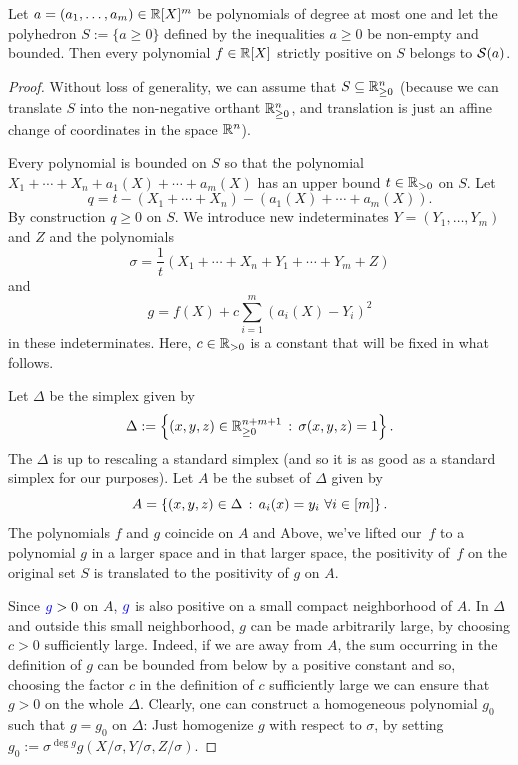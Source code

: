 \begin{theorem}
	Let $a = (a_1,\ldots,a_m) \in \mathbb{R}[X]^m$ be polynomials of degree at most one and let the polyhedron $S:= \{a \ge 0\}$ defined by the inequalities $a \ge 0$ be non-empty and bounded. Then every polynomial $f \in \mathbb{R}[X]$ strictly positive on $S$ belongs to $\mathcal{S}(a)$. 
\end{theorem}
\begin{proof}
	Without loss of generality, we can assume that $S \subseteq \mathbb{R}_{\ge 0}^n$ (because we can translate $S$ into the non-negative orthant $\mathbb{R}_{\ge 0}^n$, and translation is just an affine change of coordinates in the space $\mathbb{R}^n$). 
	
	Every polynomial is bounded on  $S$ so that the polynomial $X_1 + \cdots + X_n + a_1(X) + \cdots +a_m(X)$ has an upper bound $t \in \mathbb{R}_{> 0}$ on $S$. Let 
	\[
		q = t - (X_1 + \cdots + X_n) - (a_1(X) + \cdots + a_m(X)).
	\] 
	By construction $q \ge 0$ on $S$. We introduce new indeterminates $Y = (Y_1,\ldots,Y_m)$ and $Z$ and the polynomials 
	\[
		\sigma = \frac{1}{t} ( X_1 + \cdots + X_n + Y_1 + \cdots +Y_m + Z)
	\]
	and
	\[
		g = f(X) + c \sum_{i=1}^m (a_i(X) - Y_i)^2
	\]
	in these indeterminates. Here, $c \in \mathbb{R}_{>0}$ is a constant that will be fixed in what follows. 
	
	Let $\Delta$ be the simplex given by 
	\[
		\Delta:=\left\{ (x,y,z) \in \mathbb{R}_{\ge 0}^{n+m+1} \,:\, \sigma(x,y,z) = 1 \right\}.
	\]
	The $\Delta$ is up to rescaling a standard simplex (and so it is as good as a standard simplex for our purposes).
	Let $A$ be the subset of $\Delta$ given by 
	\[
		A = \left\{ (x,y,z) \in \Delta \,:\, a_i(x) = y_i \ \forall i \in [m] \right\}.
	\]
	The polynomials $f$ and $g$ coincide on $A$ and  Above, we've lifted our~$f$ to a polynomial $g$ in a larger space and in that larger space, the positivity of~$f$ on the original set $S$ is translated to the positivity of $g$ on $A$. 
	
	Since $\textcolor{blue}{g} > 0$ on $A$, $\textcolor{blue}{g}$ is also positive on a small compact neighborhood of $A$. In $\Delta$ and outside this small neighborhood, $g$ can be made arbitrarily large, by choosing $c>0$ sufficiently large. Indeed, if we are away from $A$, the sum occurring in the definition of $g$ can be bounded from below by a positive constant and so, choosing the factor $c$ in the definition of $c$ sufficiently large we can ensure that $g> 0$ on the whole $\Delta$. Clearly, one can construct a homogeneous polynomial $g_0$ such that $g=g_0$ on $\Delta$: Just homogenize $g$ with respect to $\sigma$, by setting $g_0 := \sigma^{\deg g} g( X / \sigma, Y / \sigma, Z / \sigma)$. 
	

\end{proof}
